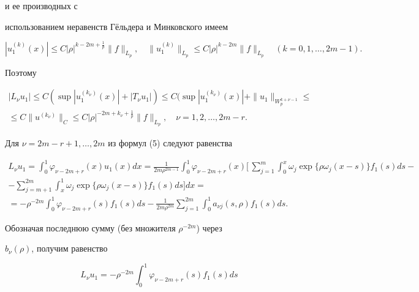 \begin{pf}
и ее производных с 


использованием неравенств Г\"ельдера и Минковского имеем 


$$ 


|u_1^{(k)}(x)|\le C|\rho|^{k-2m+\frac{1}{p}}\|f\|_{L_p}, \quad 


\|u_1^{(k)}\|_{L_p}\le C|\rho|^{k-2m}\|f\|_{L_p} \quad (k=0,1,\dotsc,2m-1). 


$$ 


Поэтому 


\begin{gather*} 


|L_\nu u_1| \le C(\sup|u_1^{(k_\nu)}(x)|+|T_\nu u_1|) \le 


C(\sup|u_1^{(k_\nu)}(x)|+\|u_1\|_{W_p^{k+\nu-1}} \le \\ 


\le C\|u^{(k_\nu)}\|_C \le C|\rho|^{-2m+k_\nu+\frac{1}{p}} 


\|f\|_{L_p}, \quad \nu=1,2,\dotsc,2m-r. 


\end{gather*} 


Для $\nu=2m-r+1,\dotsc,2m$ из формул (5) следуют равенства 


\begin{multline*} 


L_\nu u_1 =\int^1_0\varphi_{\nu-2m+r}(x)u_1(x)dx= 


\frac{1}{2m\rho^{2m-1}}\int^1_0\varphi_{\nu-2m+r}(x)\biggl[\, 


\sum^m_{j=1}\int^x_0\omega_j\exp\{\rho\omega_j(x-s)\}f_1(s)ds -\\ 


-\sum^{2m}_{j=m+1}\int^1_x\omega_j\exp\{\rho\omega_j(x-s)\}f_1(s)ds 


\biggr]dx =\\ 


=-\rho^{-2m}\int^1_0\varphi_{\nu-2m+r}(s)f_1(s)ds- 


\frac{1}{2m\rho^{2m}}\sum^{2m}_{j=1}\int^1_0 a_{\nu j}(s,\rho) 


f_1(s)ds. 


\end{multline*} 


Обозначая последнюю сумму (без множителя $\rho^{-2m}$) через 


$b_\nu(\rho)$, получим равенство 


\begin{equation} 


L_\nu u_1=-\rho^{-2m}\int^1_0 \varphi_{\nu-2m+r}(s)f_1(s)ds 



\end{equation}
\end{pf}
